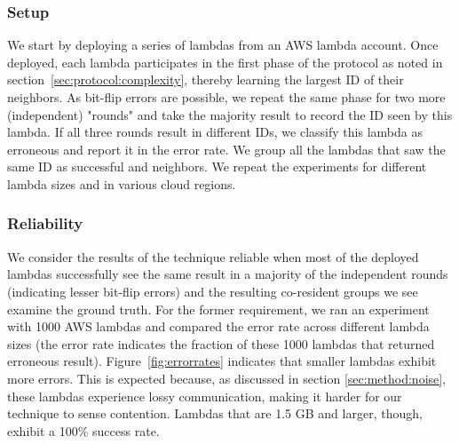 \subsubsection{Setup}
\label{subsec:expsetup}
We start by deploying a series of lambdas from an AWS lambda account.  Once
deployed, each lambda participates in the first phase of the protocol as noted
in section~\ref{sec:protocol:complexity}, thereby learning the largest ID of
their neighbors. As bit-flip errors are possible, we repeat the same phase for
two more (independent) "rounds" and take the majority result to record the ID
seen by this lambda.  If all three rounds result in different IDs, we classify
this lambda as erroneous and report it in the error rate. We group all the
lambdas that saw the same ID as successful and neighbors. We repeat the
experiments for different lambda sizes and in various cloud regions.

\subsubsection{Reliability}
We consider the results of the technique reliable when most of the deployed
lambdas successfully see the same result in a majority of the independent rounds
(indicating lesser bit-flip errors) and the resulting co-resident groups we
see examine the ground truth.  For the former requirement, 
we ran an experiment with 1000 AWS
lambdas and compared the error rate across different lambda sizes (the error
rate indicates the fraction of these 1000 lambdas that returned erroneous result).
 Figure~\ref{fig:errorrates} 
indicates that smaller lambdas exhibit
more errors.  This is expected because, as discussed in section
\ref{sec:method:noise}, these lambdas experience lossy communication, making it
harder for our technique to sense contention. Lambdas that are 1.5 GB and
larger, though, exhibit a 100\% success rate.

